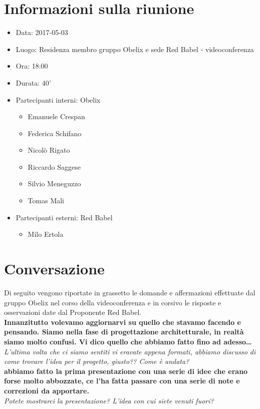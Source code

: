 \documentclass[10 pt,a4paper, openany]{article}
\date{}
\begin{document}
\paginatitolo
\section{Informazioni sulla riunione}

\begin{itemize}
\item[] Data: 2017-05-03
\item[] Luogo: Residenza membro gruppo Obelix e sede Red Babel - videoconferenza
\item[] Ora: 18:00
\item[] Durata: 40'
\item[] Partecipanti interni: Obelix
  \begin{itemize}
  \item[] Emanuele Crespan
  \item[] Federica Schifano
  \item[] Nicolò Rigato
  \item[] Riccardo Saggese
  \item[] Silvio Meneguzzo
  \item[] Tomas Mali
  \end{itemize}
\item[] Partecipanti esterni: Red Babel
  \begin{itemize}
  \item[] Milo Ertola
  \end{itemize}
\end{itemize}

\section{Conversazione}

Di seguito vengono riportate in grassetto le domande e affermazioni effettuate dal gruppo Obelix
nel corso della videoconferenza e in corsivo le risposte e osservazioni date dal Proponente Red Babel.\\

\textbf{Innanzitutto volevamo aggiornarvi su quello che stavamo facendo e pensando. Siamo nella fase di progettazione architetturale, in realtà siamo molto confusi. 
Vi dico quello che abbiamo fatto fino ad adesso…}\\
\textit{L’ultima volta che ci siamo sentiti vi eravate appena formati, abbiamo discusso di come trovare l’idea per il progetto, giusto?? Come è andata?
}\\

\textbf{abbiamo fatto la prima presentazione con una serie di idee che erano forse molto abbozzate, ce l’ha fatta passare con una serie di note e correzioni da apportare.}\\
\textit{Potete mostrarci la presentazione?
L’idea con cui siete venuti fuori?}\\
\end{document}
